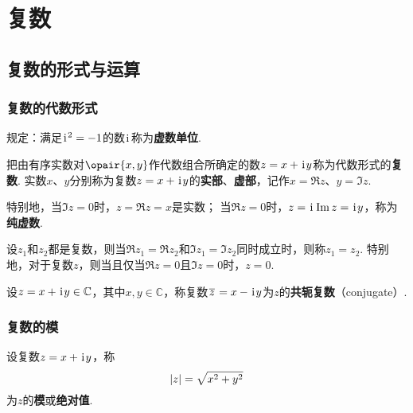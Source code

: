 \chapter{复数}
\section{复数的形式与运算}
\subsection{复数的代数形式}
\begin{definition}[虚数单位]
规定：满足\(\kern1pt\mathrm{i}\kern1pt^2=-1\)的数\(\kern1pt\mathrm{i}\kern1pt\)称为\textbf{虚数单位}.
\end{definition}

\begin{definition}[复数的代数形式]
把由有序实数对\(\opair{x,y}\)作代数组合所确定的数\(z=x+\kern1pt\mathrm{i}\kern1pt y\)称为代数形式的\textbf{复数}.
实数\(x\)、\(y\)分别称为复数\(z=x+\kern1pt\mathrm{i}\kern1pt y\)的\textbf{实部}、\textbf{虚部}，记作\(x=\Re z\)、\(y=\Im z\).

特别地，当\(\Im z=0\)时，\(z=\Re z=x\)是实数；
当\(\Re z=0\)时，\(z=\kern1pt\mathrm{i}\kern1pt\Im z=\kern1pt\mathrm{i}\kern1pt y\)，称为\textbf{纯虚数}.
\end{definition}

\begin{definition}[代数形式下复数相等条件]
设\(z_1\)和\(z_2\)都是复数，则当\(\Re z_1 = \Re z_2\)和\(\Im z_1 = \Im z_2\)同时成立时，则称\(z_1 = z_2\).
特别地，对于复数\(z\)，则当且仅当\(\Re z=0\)且\(\Im z=0\)时，\(z=0\).
\end{definition}

\begin{definition}[共轭复数]
设\(z=x + \kern1pt\mathrm{i}\kern1pt y \in\mathbb{C}\)，其中\(x,y\in\mathbb{C}\)，称复数\(\kern1pt\overline{z}\kern1pt=x - \kern1pt\mathrm{i}\kern1pt y\)为\(z\)的\textbf{共轭复数}（conjugate）.
\end{definition}

\subsection{复数的模}
\begin{definition}[复数的模]
设复数\(z = x + \kern1pt\mathrm{i}\kern1pt y\)，称\[
\abs{z} = \sqrt{x^2 + y^2}
\]为\(z\)的\textbf{模}或\textbf{绝对值}.
\end{definition}

